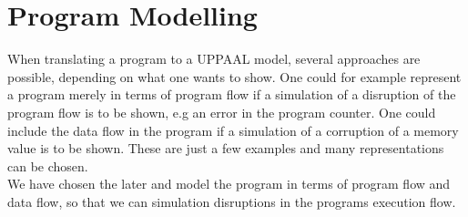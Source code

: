 \section{Program Modelling}
When translating a program to a UPPAAL model, several approaches are possible, depending on what one wants to show. One could for example represent a program merely in terms of program flow if a simulation of a disruption of the program flow is to be shown, e.g an error in the program counter. One could include the data flow in the program if a simulation of a corruption of a memory value is to be shown. These are just a few examples and many representations can be chosen.\\

We have chosen the later and model the program in terms of program flow and data flow, so that we can simulation disruptions in the programs execution flow. 



